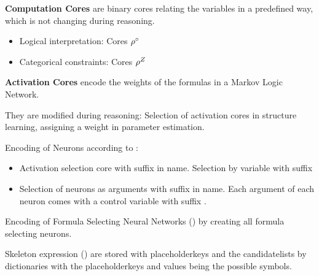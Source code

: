 
\textbf{Computation Cores} are binary cores relating the variables in a predefined way, which is not changing during reasoning.
\begin{itemize}
    \item Logical interpretation: Cores $\rho^{\circ}$ 
    \item Categorical constraints: Cores $\rho^{Z}$
\end{itemize}

\textbf{Activation Cores} encode the weights of the formulas in a Markov Logic Network.

They are modified during reasoning: Selection of activation cores in structure learning, assigning a weight in parameter estimation.




Encoding of Neurons according to :
\begin{itemize}
    \item Activation selection core with suffix  in name.
    Selection by variable with suffix 
    \item Selection of neurons as arguments with suffix  in name.
    Each argument of each neuron comes with a control variable with suffix .
\end{itemize}

Encoding of Formula Selecting Neural Networks () by creating all formula selecting neurons.

Skeleton expression () are stored with placeholderkeys and the candidatelists by dictionaries with the placeholderkeys and values being the possible symbols.
